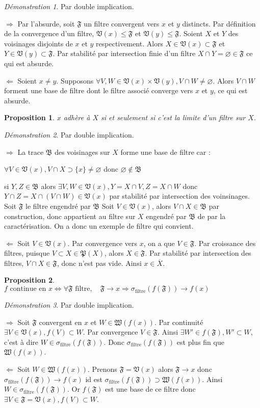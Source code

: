 \documentclass[a4paper, 11pt, french]{book}
\newenvironment{itemise}{\itemize}{\enditemize}
\theoremstyle{plain} %
\newtheorem{proposition}{Proposition}
\theoremstyle{definition} %
\theoremstyle{remark} %
\newtheorem*{demonstration}{Démonstration}
\newcommand{\1}{\mathds{1}}
\newcommand\vide{\varnothing}
\renewcommand{\frak}[1]{\mathfrak{#1}}
\renewcommand{\rm}[1]{\mathrm{#1}}
\newcommand\equivalence[3]{
	\begin{demonstration}
		#1
		\begin{itemise}
			\item[$\Longrightarrow$] #2
			\item[$\Longleftarrow$] #3
		\end{itemise}
	\end{demonstration}
}
\begin{document}
\equivalence{Par double implication.}{
	Par l'absurde, soit $\frak{F}$ un filtre convergent vers $x$ et $y$ distincts.
		Par définition de la convergence d'un filtre, $\frak{V}(x)\leqslant\frak{F}$ et $\frak{V}(y)\leqslant\frak{F}$.
		Soient $X$ et $Y$ des voisinages disjoints de $x$ et $y$ respectivement.
		Alors $X\in\frak{V}(x)\subset\frak{F}$ et $Y\in\frak{V}(y)\subset\frak{F}$.
		Par stabilité par intersection finie d'un filtre $X\cap Y=\vide\in\frak{F}$ ce qui est absurde.
}{
	Soient $x\neq y$.
		Supposons $\forall V, W\in\frak{V}(x)\times\frak{V}(y), V\cap W\neq\vide$.
		Alors $V\cap W$ forment une base de filtre dont le filtre associé converge vers $x$ et $y$, ce qui est absurde.
}

\begin{proposition}
	$x$ adhère à $X$ si et seulement si c'est la limite d'un filtre sur $X$.
\end{proposition}

\equivalence{Par double implication.}{
	La trace $\frak{B}$ des voisinages sur $X$ forme une base de filtre car :
		\begin{itemise}
			\item $\forall V\in\frak{V}(x), V\cap X\supset\{x\}\neq\vide$ donc $\vide\notin\frak{B}$
			\item si $Y, Z\in\frak{B}$ alors $\exists V, W\in\frak{V}(x), Y=X\cap V, Z=X\cap W$ donc $Y\cap Z=X\cap(V\cap W)\in\frak{V}(x)$ par stabilité par intersection des voinsinages.
		\end{itemise}
		Soit $\frak{F}$ le filtre engendré par $\frak{B}$
		Soit $V\in\frak{V}(x)$, alors $V\cap X\in\frak{B}$ par construction, donc appartient au filtre sur $X$ engendré par $\frak{B}$ de par la caractérisation.
		On a donc un exemple de filtre qui convient.
}{
	Soit $V\in\frak{V}(x)$.
		Par convergence vers $x$, on a que $V\in\frak{F}$.
		Par croissance des filtres, puisque $V\subset X\in\frak{P}(X)$, alors $X\in\frak{F}$.
		Par stabilité par intersection des filtres, $V\cap X\in\frak{F}$, donc n'est pas vide.
		Ainsi $x\in\overline{X}$.
}

\begin{proposition}
	$f\text{ continue en }x\iff\forall\frak{F}\text{ filtre},\quad\frak{F}\rightarrow x\Rightarrow\sigma_\rm{filtre}(f(\frak{F}))\rightarrow f(x)$
\end{proposition}

\equivalence{Par double implication.}{
	Soit $\frak{F}$ convergent en $x$ et $W\in\frak{W}(f(x))$.
		Par continuité $\exists V\in\frak{V}(x), f(V)\subset W$.
		Par convergence $V\in\frak{F}$.
		Ainsi $\exists W'\in f(\frak{F}), W'\subset W$, c'est à dire $W\in\sigma_\rm{filtre}(f(\frak{F}))$.
		Donc $\sigma_\rm{filtre}(f(\frak{F}))$ est plus fin que $\frak{W}(f(x))$.
}{
	Soit $W\in\frak{W}(f(x))$.
		Prenons $\frak{F}=\frak{V}(x)$ alors $\frak{F}\rightarrow x$ donc $\sigma_\rm{filtre}(f(\frak{F}))\rightarrow f(x)$ id est $\sigma_\rm{filtre}(f(\frak{F}))\supset\frak{W}(f(x))$.
		Ainsi $W\in\sigma_\rm{filtre}(f(\frak{F}))$.
		Or $f(\frak{F})$ est une base de ce filtre donc $\exists V\in\frak{F}=\frak{V}(x), f(V)\subset W$.
}
\end{document}

